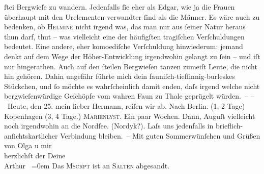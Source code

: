 \begin{ledgroupsized}[t]{13cm}
                  ſtei Bergwieſe zu wandern. Jedenfalls ſie eher als Edgar, wie ja die Frauen
               überhaupt mit den Urelementen verwandter ſind als die Männer. Es wäre auch zu
               bedenken, ob \textsc{Helmine} nicht irgend was, das man nur aus {\pb}ſeiner Natur heraus
               thun darf, \label{K_L01604_2v}\label{K_L01604_2h} thut – was
               vielleicht eine der häufigſten tragiſchen Verſchuldungen bedeutet. Eine andere, eher
               komoediſche Verſchuldung hinwiederum: jemand denkt auf dem Wege der \introOben{}Höher-\introOben{}Entwicklung irgendwohin gelangt  zu ſein – und iſt nur \label{K_L01604_3v}\label{K_L01604_3h} hingerathen.
               Auch auf den ſteilen Bergwieſen tanzen zumeiſt Leute, die nicht hin gehören. Dahin
               ungefähr führte mich dein fauniſch-tiefſinnig-burleskes Stückchen, und ſo möchte es wahrſcheinlich damit {\pb}enden, daſs irgend
               welche nicht bergwieſenwürdige Geſchöpfe vom wahren Faun zu Thale geprügelt
               würden. –\pend
           \pstart
           \noindent{}– Heute, \introOben{}den 25.\introOben{} mein lieber Hermann, reiſen wir ab. Nach
                  Berlin. (1, 2 Tage) Kopenhagen (3, 4 Tage.) \textsc{Marienlyst}. Ein paar Wochen. Dann, Auguſt vielleicht noch irgendwohin an die Nordſee. (Nordyk?). Laſs
               uns jedenfalls in brieflich-anſichtskartlicher Verbindung bleiben. – \pend
           \pstart
           Mit guten Sommerwünſchen und {\pb}Grüßen von Olga u mir{\\[\baselineskip]}herzlichſt der Deine{\\[\baselineskip]}\spacefill\mbox{Arthur }\pend
           \leftskip=0em{}\pstart
           \noindent{}Das \textsc{Mscrpt} ist an \textsc{Salten} abgesandt.\pend
           \endnumbering{}\end{ledgroupsized}  \newcommand{\dateiname}{L01604}\newcommand{\titel}{Arthur Schnitzler an Hermann Bahr, 24.–25. 6. 1906}\newcommand{\editorInnen}{ Kurt Ifkovits,  Martin Anton Müller}
            \footnotesize
\begin{ledgroupsized}[t]{11.5cm}
\end{ledgroupsized}
         
      
